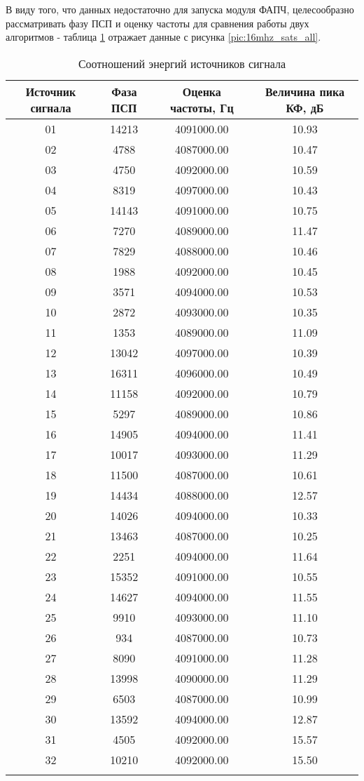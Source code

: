 В виду того, что данных недостаточно для запуска модуля ФАПЧ, целесообразно рассматривать фазу ПСП и оценку частоты для сравнения работы двух
алгоритмов - таблица \ref{tbl:16mhz_sats_all} отражает данные с рисунка \ref{pic:16mhz_sats_all}.
\begin{center}
	\begin{longtable}{ | c | c | c | c |}
	\hline
	Источник сигнала & Фаза ПСП & Оценка частоты, Гц & Величина пика КФ, дБ \\ \hline
	01 & 14213	& 4091000.00	& 10.93 \\ \hline 
	02 & 4788	& 4087000.00	& 10.47 \\ \hline
	03 & 4750	& 4092000.00	& 10.59 \\ \hline
	04 & 8319	& 4097000.00	& 10.43 \\ \hline
	05 & 14143	& 4091000.00	& 10.75 \\ \hline
	06 & 7270	& 4089000.00	& 11.47 \\ \hline
	07 & 7829	& 4088000.00	& 10.46 \\ \hline
	08 & 1988	& 4092000.00	& 10.45 \\ \hline
	09 & 3571	& 4094000.00	& 10.53 \\ \hline
	10 & 2872	& 4093000.00	& 10.35 \\ \hline
	11 & 1353	& 4089000.00	& 11.09 \\ \hline
	12 & 13042	& 4097000.00	& 10.39 \\ \hline
	13 & 16311	& 4096000.00	& 10.49 \\ \hline
	14 & 11158	& 4092000.00	& 10.79 \\ \hline
	15 & 5297	& 4089000.00	& 10.86 \\ \hline
	16 & 14905	& 4094000.00	& 11.41 \\ \hline
	17 & 10017	& 4093000.00	& 11.29 \\ \hline
	18 & 11500	& 4087000.00	& 10.61 \\ \hline
	19 & 14434	& 4088000.00	& 12.57 \\ \hline
	20 & 14026	& 4094000.00	& 10.33 \\ \hline
	21 & 13463	& 4087000.00	& 10.25 \\ \hline
	22 & 2251	& 4094000.00	& 11.64 \\ \hline
	23 & 15352	& 4091000.00	& 10.55 \\ \hline
	24 & 14627	& 4094000.00	& 11.55 \\ \hline
	25 & 9910	& 4093000.00	& 11.10 \\ \hline
	26 & 934	& 4087000.00	& 10.73 \\ \hline
	27 & 8090	& 4091000.00	& 11.28 \\ \hline
	28 & 13998	& 4090000.00	& 11.29 \\ \hline
	29 & 6503	& 4087000.00	& 10.99 \\ \hline
	30 & 13592	& 4094000.00	& 12.87 \\ \hline
	31 & 4505	& 4092000.00	& 15.57 \\ \hline
	32 & 10210	& 4092000.00	& 15.50 \\ \hline
	\caption{Соотношений энергий источников сигнала}
	\label{tbl:16mhz_sats_all}
	\end{longtable}
\end{center}

